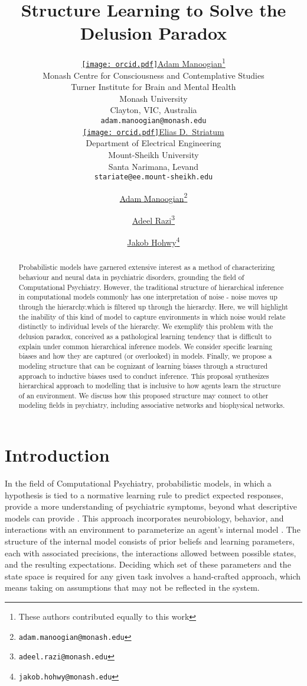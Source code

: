 \documentclass{article}
\title{Structure Learning to Solve the Delusion Paradox}
\author{ \href{https://orcid.org/0009-0002-8002-3191}{\texttt{[image: orcid.pdf]}\hspace{1mm}Adam Manoogian}\thanks{These authors contributed equally to this work} \\
    Monash Centre for Consciousness and Contemplative Studies\\
	Turner Institute for Brain and Mental Health\\
	Monash University\\
	Clayton, VIC, Australia \\
	\texttt{adam.manoogian@monash.edu} \\
	\And
	\href{https://orcid.org/0000-0000-0000-0000}{\texttt{[image: orcid.pdf]}\hspace{1mm}Elias D.~Striatum} \\
	Department of Electrical Engineering\\
	Mount-Sheikh University\\
	Santa Narimana, Levand \\
	\texttt{stariate@ee.mount-sheikh.edu} \\
}
\author[1,2]{%
	\href{https://orcid.org/0000-0000-0000-0000}{\usebox{\orcid}\hspace{1mm}Adam Manoogian\thanks{\texttt{adam.manoogian@monash.edu}}}%
}
\author[2]{%
	\href{https://orcid.org/0000-0000-0000-0000}{\usebox{\orcid}\hspace{1mm}Adeel  Razi\thanks{\texttt{adeel.razi@monash.edu}}}%
}
\author[1]{%
	\href{https://orcid.org/0000-0000-0000-0000}{\usebox{\orcid}\hspace{1mm}Jakob  Hohwy\thanks{\texttt{jakob.hohwy@monash.edu}}}%
}
\affil[1]{Monash Centre for Consciousness and Contemplative Studies, Monash University, Melbourne, Australia}
\affil[2]{Monash Biomedical Imaging, Monash University, Melbourne, Australia}
\begin{document}
\maketitle

\begin{abstract}
Probabilistic models have garnered extensive interest as a method of characterizing behaviour and neural data in psychiatric disorders, grounding the field of Computational Psychiatry. However, the traditional structure of hierarchical inference in computational models commonly has one interpretation of noise - noise moves up through the hierarchy.which is filtered up through the hierarchy. Here, we will highlight the inability of this kind of model to capture environments in which noise would relate distinctly to individual levels of the hierarchy. We exemplify this problem with the delusion paradox, conceived as a pathological learning tendency that is difficult to explain under common hierarchical inference models. We consider specific learning biases and how they are captured (or overlooked) in models. Finally, we propose a modeling structure that can be cognizant of learning biases through a structured approach to inductive biases used to conduct inference. This proposal synthesizes hierarchical approach to modelling that is inclusive to how agents learn the structure of an environment. We discuss how this proposed structure may connect to other modeling fields in psychiatry, including associative networks and biophysical networks.
\end{abstract}



\section{Introduction}

In the field of Computational Psychiatry, probabilistic models, in which a hypothesis is tied to a normative learning rule to predict expected responses, provide a more  understanding of psychiatric symptoms, beyond what descriptive models can provide \citep{vrizzi2023comparing, haines2023from}. This approach incorporates neurobiology, behavior, and interactions with an environment to parameterize an agent's internal model \citep{adams2016computational}. The structure of the internal model consists of prior beliefs and learning parameters, each with associated precisions, the interactions allowed between possible states, and the resulting expectations. Deciding which set of these parameters and the state space is required for any given task involves a hand-crafted approach, which means taking on assumptions that may not be reflected in the system. 
\end{document}
